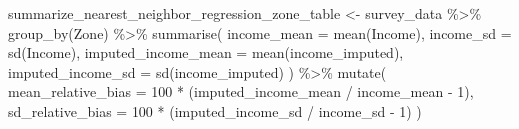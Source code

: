 \documentclass[
  spanish,
  11pt,
  letterpaper,
  oneside,
  open=any]{scrbook}
\newenvironment{Shaded}{\begin{snugshade}}{\end{snugshade}}
\newcommand{\AttributeTok}[1]{\textcolor[rgb]{0.40,0.45,0.13}{#1}}
\newcommand{\DecValTok}[1]{\textcolor[rgb]{0.68,0.00,0.00}{#1}}
\newcommand{\FunctionTok}[1]{\textcolor[rgb]{0.28,0.35,0.67}{#1}}
\newcommand{\NormalTok}[1]{\textcolor[rgb]{0.00,0.23,0.31}{#1}}
\newcommand{\OtherTok}[1]{\textcolor[rgb]{0.00,0.23,0.31}{#1}}
\newcommand{\SpecialCharTok}[1]{\textcolor[rgb]{0.37,0.37,0.37}{#1}}
\begin{document}
\begin{Shaded}
\begin{Highlighting}[]
\NormalTok{summarize\_nearest\_neighbor\_regression\_zone\_table }\OtherTok{\textless{}{-}}\NormalTok{ survey\_data }\SpecialCharTok{\%\textgreater{}\%}
  \FunctionTok{group\_by}\NormalTok{(Zone) }\SpecialCharTok{\%\textgreater{}\%}
  \FunctionTok{summarise}\NormalTok{(}
    \AttributeTok{income\_mean =} \FunctionTok{mean}\NormalTok{(Income),}
    \AttributeTok{income\_sd =} \FunctionTok{sd}\NormalTok{(Income),}
    \AttributeTok{imputed\_income\_mean =} \FunctionTok{mean}\NormalTok{(income\_imputed),}
    \AttributeTok{imputed\_income\_sd =} \FunctionTok{sd}\NormalTok{(income\_imputed)}
\NormalTok{  ) }\SpecialCharTok{\%\textgreater{}\%}
  \FunctionTok{mutate}\NormalTok{(}
    \AttributeTok{mean\_relative\_bias =} \DecValTok{100} \SpecialCharTok{*}\NormalTok{ (imputed\_income\_mean }\SpecialCharTok{/}\NormalTok{ income\_mean }\SpecialCharTok{{-}} \DecValTok{1}\NormalTok{),}
    \AttributeTok{sd\_relative\_bias =} \DecValTok{100} \SpecialCharTok{*}\NormalTok{ (imputed\_income\_sd }\SpecialCharTok{/}\NormalTok{ income\_sd }\SpecialCharTok{{-}} \DecValTok{1}\NormalTok{)}
\NormalTok{  )}
\end{Highlighting}
\end{Shaded}
\end{document}
